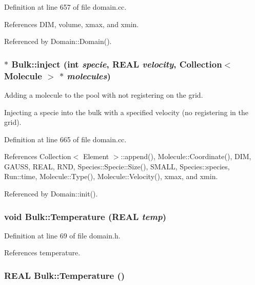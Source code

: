Definition at line 657 of file domain.cc.

References DIM, volume, xmax, and xmin.

Referenced by Domain::Domain().\hypertarget{classBulk_201f623418ac1056a3b1a34a5a02ed12}{
\subsubsection[{inject}]{ $\ast$ Bulk::inject (int {\em specie}, \/  REAL {\em velocity}, \/  {\bf Collection}$<$ {\bf Molecule} $>$ $\ast$ {\em molecules})}}
\label{classBulk_201f623418ac1056a3b1a34a5a02ed12}


Adding a molecule to the pool with not registering on the grid. 

Injecting a specie into the bulk with a specified velocity (no registering in the grid). 

Definition at line 665 of file domain.cc.

References Collection$<$ Element $>$::append(), Molecule::Coordinate(), DIM, GAUSS, REAL, RND, Species::Specie::Size(), SMALL, Species::species, Run::time, Molecule::Type(), Molecule::Velocity(), xmax, and xmin.

Referenced by Domain::init().\hypertarget{classBulk_7b569f588bb4e079a23a28a843a05004}{
\subsubsection[{Temperature}]{\setlength{\rightskip}{0pt plus 5cm}void Bulk::Temperature (REAL {\em temp})}}
\label{classBulk_7b569f588bb4e079a23a28a843a05004}




Definition at line 69 of file domain.h.

References temperature.\hypertarget{classBulk_144b86ce82e59e0fc17ff6d3fe137ee2}{
\subsubsection[{Temperature}]{\setlength{\rightskip}{0pt plus 5cm}REAL Bulk::Temperature ()}}
\label{classBulk_144b86ce82e59e0fc17ff6d3fe137ee2}




